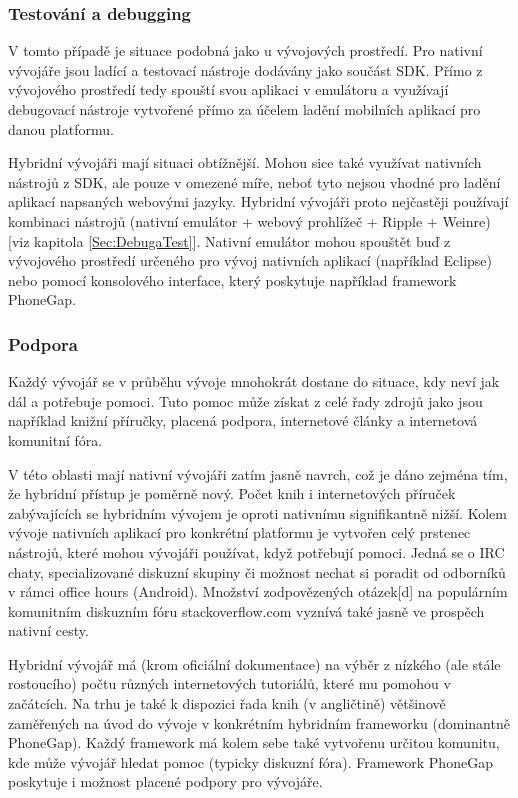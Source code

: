 \subsubsection{Testování a debugging}
V tomto případě je situace podobná jako u vývojových prostředí. Pro nativní vývojáře jsou ladící a testovací nástroje dodávány jako součást SDK. Přímo z vývojového prostředí tedy spouští svou aplikaci v emulátoru a využívají debugovací nástroje vytvořené přímo za účelem ladění mobilních aplikací pro danou platformu.

Hybridní vývojáři mají situaci obtížnější. Mohou sice také využívat nativních nástrojů z SDK, ale pouze v omezené míře, neboť tyto nejsou vhodné pro ladění aplikací napsaných webovými jazyky. Hybridní vývojáři proto nejčastěji používají kombinaci nástrojů (nativní emulátor + webový prohlížeč + Ripple + Weinre) [viz kapitola \ref{Sec:DebugaTest}]. Nativní emulátor mohou spouštět buď z vývojového prostředí určeného pro vývoj nativních aplikací (například Eclipse) nebo pomocí konsolového interface, který poskytuje například framework PhoneGap.

\subsubsection{Podpora}
Každý vývojář se v průběhu vývoje mnohokrát dostane do situace, kdy neví jak dál a potřebuje pomoci. Tuto pomoc může získat z celé řady zdrojů jako jsou například knižní příručky, placená podpora, internetové články a internetová komunitní fóra.

V této oblasti mají nativní vývojáři zatím jasně navrch, což je dáno zejména tím, že hybridní přístup je poměrně nový. Počet knih i internetových příruček zabývajících se hybridním vývojem je oproti nativnímu signifikantně nižší. Kolem vývoje nativních aplikací pro konkrétní platformu je vytvořen celý prstenec nástrojů, které mohou vývojáři používat, když potřebují pomoci. Jedná se o IRC chaty, specializované diskuzní skupiny či možnost nechat si poradit od odborníků v rámci office hours (Android). Množství zodpovězených otázek[d] na populárním komunitním diskuzním fóru stackoverflow.com vyznívá také jasně ve prospěch nativní cesty.

Hybridní vývojář má (krom oficiální dokumentace) na výběr z nízkého (ale stále rostoucího) počtu různých internetových tutoriálů, které mu pomohou v začátcích. Na trhu je také k dispozici řada knih (v angličtině) většinově zaměřených na úvod do vývoje v konkrétním hybridním frameworku (dominantně PhoneGap). Každý framework má kolem sebe také vytvořenu určitou komunitu, kde může vývojář hledat pomoc (typicky diskuzní fóra). Framework PhoneGap poskytuje i možnost placené podpory pro vývojáře. 

